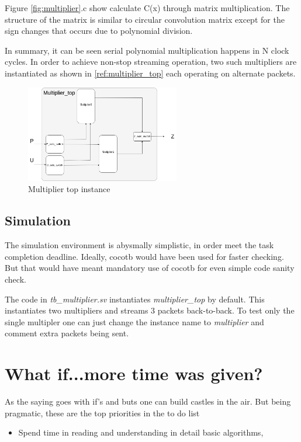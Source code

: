 \documentclass{article}
\begin{document}
    Figure \ref{fig:multiplier}.c show calculate C(x) through matrix multiplication. The structure of the matrix is similar to circular 
    convolution matrix except for the sign changes that occurs due to polynomial division.

    In summary, it can be seen serial polynomial multiplication happens in N clock cycles. In order to achieve non-stop streaming operation, two such
    multipliers are instantiated as shown in \ref{ref:multiplier_top} each operating on alternate packets.

    \begin{figure}[htp] 
      \centering
      \includegraphics[width=0.6\textwidth]{multiplier_top.png}
      \caption{Multiplier top instance}
      \label{fig:multiplier_top} 
    \end{figure}

    \subsection{Simulation}
    The simulation environment is abysmally simplistic, in order meet the task completion deadline. Ideally, cocotb would have
    been used for faster checking. But that would have meant mandatory use of cocotb for even simple code sanity check. 

    The code in \textit{tb\_multiplier.sv} instantiates \textit{multiplier\_top} by default. This instantiates two multipliers 
    and streams 3 packets back-to-back. To test only the single multipler one can just change the instance name to \textit{multiplier} 
    and comment extra packets being sent. 

    \section{What if...more time was given?}

    As the saying goes with if's and buts one can build castles in the air. But being pragmatic, these are the top priorities in the to do list
    \begin{itemize}
      \item Spend time in reading and understanding  in detail basic algorithms, 
    \end{itemize}
    
\end{document}
